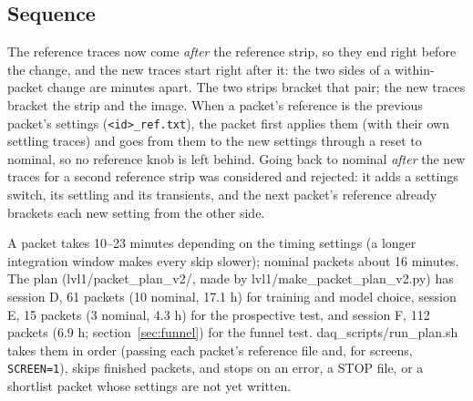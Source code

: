 \documentclass[11pt]{article}
\begin{document}
\subsection{Sequence}
\begin{center}
\end{center}
The reference traces now come \emph{after} the reference strip, so they end right before the change, and the new
traces start right after it: the two sides of a within-packet change are minutes apart. The two strips bracket that
pair; the new traces bracket the strip and the image. When a packet's reference is the previous packet's settings
(\texttt{<id>\_ref.txt}), the packet first applies them (with their own settling traces) and goes from them to the new
settings through a reset to nominal, so no reference knob is left behind. Going back to nominal \emph{after} the new
traces for a second reference strip was considered and rejected: it adds a settings switch, its settling and its
transients, and the next packet's reference already brackets each new setting from the other side.

A packet takes 10--23 minutes depending on the timing settings (a longer integration window makes every skip slower);
nominal packets about 16 minutes. The plan (lvl1/packet\_plan\_v2/, made by lvl1/make\_packet\_plan\_v2.py) has
session D, 61 packets (10 nominal, 17.1 h) for training and model choice, session E, 15 packets (3 nominal, 4.3 h)
for the prospective test, and session F, 112 packets (6.9 h; section~\ref{sec:funnel}) for the funnel test.
daq\_scripts/run\_plan.sh takes them in order (passing each packet's reference file and, for screens,
\texttt{SCREEN=1}), skips finished packets, and stops on an error, a STOP file, or a shortlist packet whose settings are
not yet written.
\end{document}
